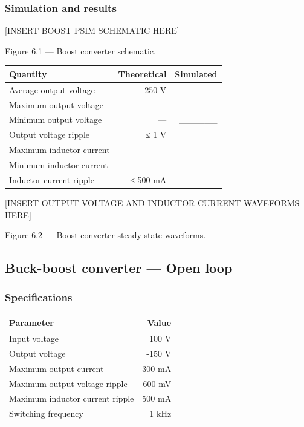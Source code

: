 \documentclass[
  paper=a4,
  oneside  ,captions=tableheading
]{scrartcl}
\newcounter{none}
\begin{document}
\subsubsection{Simulation and results}\label{simulation-and-results}

{[}INSERT BOOST PSIM SCHEMATIC HERE{]}

Figure 6.1 --- Boost converter schematic.

{\def\LTcaptype{none} %
\begin{longtable}[]{@{}lrr@{}}
\toprule\noalign{}
Quantity & Theoretical & Simulated \\
\midrule\noalign{}
\endhead
\bottomrule\noalign{}
\endlastfoot
Average output voltage & 250 V & \_\_\_\_\_\_ \\
Maximum output voltage & --- & \_\_\_\_\_\_ \\
Minimum output voltage & --- & \_\_\_\_\_\_ \\
Output voltage ripple & ≤ 1 V & \_\_\_\_\_\_ \\
Maximum inductor current & --- & \_\_\_\_\_\_ \\
Minimum inductor current & --- & \_\_\_\_\_\_ \\
Inductor current ripple & ≤ 500 mA & \_\_\_\_\_\_ \\
\end{longtable}
}

{[}INSERT OUTPUT VOLTAGE AND INDUCTOR CURRENT WAVEFORMS HERE{]}

Figure 6.2 --- Boost converter steady-state waveforms.

\subsection{Buck-boost converter --- Open
loop}\label{buck-boost-converter-open-loop}

\subsubsection{Specifications}\label{specifications-1}

{\def\LTcaptype{none} %
\begin{longtable}[]{@{}lr@{}}
\toprule\noalign{}
Parameter & Value \\
\midrule\noalign{}
\endhead
\bottomrule\noalign{}
\endlastfoot
Input voltage & 100 V \\
Output voltage & -150 V \\
Maximum output current & 300 mA \\
Maximum output voltage ripple & 600 mV \\
Maximum inductor current ripple & 500 mA \\
Switching frequency & 1 kHz \\
\end{longtable}
}
\end{document}
